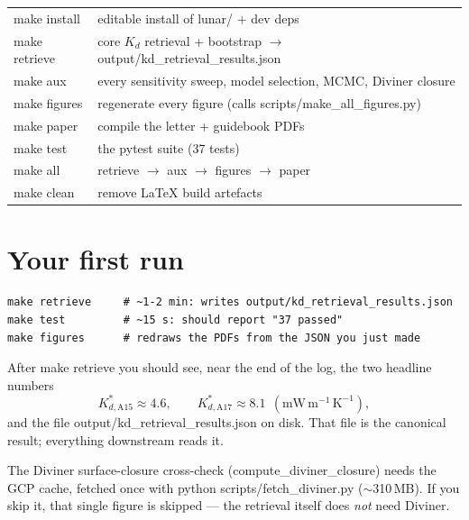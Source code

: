 \documentclass[11pt]{report}
\newcommand{\code}[1]{{\ttfamily\small #1}}
\newcommand{\file}[1]{\textcolor{forest}{\ttfamily #1}}
\begin{document}
\begin{center}\small
\begin{tabular}{@{}lp{9.4cm}@{}}
\toprule
\code{make install} & editable install of \file{lunar/} + dev deps \\
\code{make retrieve} & core $K_d$ retrieval + bootstrap $\rightarrow$ \file{output/kd\_retrieval\_results.json} \\
\code{make aux} & every sensitivity sweep, model selection, MCMC, Diviner closure \\
\code{make figures} & regenerate every figure (calls \file{scripts/make\_all\_figures.py}) \\
\code{make paper} & compile the letter + guidebook PDFs \\
\code{make test} & the \code{pytest} suite (37 tests) \\
\code{make all} & \code{retrieve} $\rightarrow$ \code{aux} $\rightarrow$ \code{figures} $\rightarrow$ \code{paper} \\
\code{make clean} & remove LaTeX build artefacts \\
\bottomrule
\end{tabular}
\end{center}

\section{Your first run}

\begin{lstlisting}[style=sh]
make retrieve     # ~1-2 min: writes output/kd_retrieval_results.json
make test         # ~15 s: should report "37 passed"
make figures      # redraws the PDFs from the JSON you just made
\end{lstlisting}

After \code{make retrieve} you should see, near the end of the log, the
two headline numbers
\[
K_{d,\mathrm{A15}}^{*}\approx 4.6,\qquad
K_{d,\mathrm{A17}}^{*}\approx 8.1\ \ \mathrm{(mW\,m^{-1}\,K^{-1})},
\]
and the file \file{output/kd\_retrieval\_results.json} on disk. That file
is the canonical result; everything downstream reads it.

\begin{gotcha}
The Diviner surface-closure cross-check (\code{compute\_diviner\_closure})
needs the GCP cache, fetched once with \code{python
scripts/fetch\_diviner.py} ($\sim$310\,MB). If you skip it, that single
figure is skipped --- the retrieval itself does \emph{not} need Diviner.
\end{gotcha}
\end{document}

